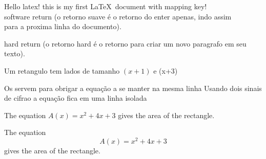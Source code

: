 \documentclass[12pt]{article}
\begin{document}
  Hello latex! this is my first \LaTeX\ document with mapping key!\\
 software return (o retorno suave é o retorno do enter apenas, indo assim\\
 para a proxima linha do documento).

 hard return (o retorno hard é o retorno para criar um novo paragrafo em seu texto).

 Um retangulo tem lados de tamanho $(x+1)$ e (x+3)
 
 Os {} servem para obrigar a equação a se manter na mesma linha
 Usando dois sinais de cifrao a equação fica em uma linha isolada

 The equation ${A(x) = x^2+4x+3}$ gives the area of the rectangle.

 The equation \[{A(x) = x^2+4x+3}\] gives the area of the rectangle.
\end{document}
